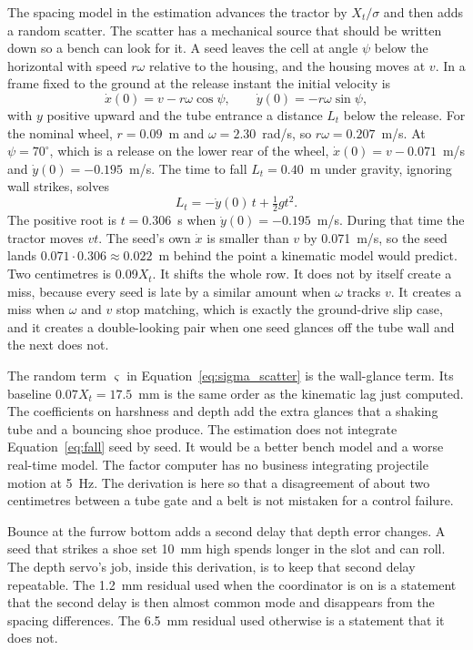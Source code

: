 The spacing model in the estimation advances the tractor by $X_t/\sigma$ and then adds a random scatter. The scatter has a mechanical source that should be written down so a bench can look for it. A seed leaves the cell at angle $\psi$ below the horizontal with speed $r\omega$ relative to the housing, and the housing moves at $v$. In a frame fixed to the ground at the release instant the initial velocity is
\begin{equation}
\dot x(0) = v - r\omega\cos\psi, \qquad \dot y(0) = -r\omega\sin\psi,
\label{eq:v0}
\end{equation}
with $y$ positive upward and the tube entrance a distance $L_t$ below the release. For the nominal wheel, $r=0.09$~m and $\omega=2.30$~rad/s, so $r\omega=0.207$~m/s. At $\psi=70^\circ$, which is a release on the lower rear of the wheel, $\dot x(0)=v-0.071$~m/s and $\dot y(0)=-0.195$~m/s. The time to fall $L_t=0.40$~m under gravity, ignoring wall strikes, solves
\begin{equation}
L_t = -\dot y(0)\,t + \tfrac12 g t^2.
\label{eq:fall}
\end{equation}
The positive root is $t=0.306$~s when $\dot y(0)=-0.195$~m/s. During that time the tractor moves $vt$. The seed's own $\dot x$ is smaller than $v$ by 0.071~m/s, so the seed lands $0.071\cdot 0.306\approx 0.022$~m behind the point a kinematic model would predict. Two centimetres is 0.09$X_t$. It shifts the whole row. It does not by itself create a miss, because every seed is late by a similar amount when $\omega$ tracks $v$. It creates a miss when $\omega$ and $v$ stop matching, which is exactly the ground-drive slip case, and it creates a double-looking pair when one seed glances off the tube wall and the next does not.

The random term $\varsigma$ in Equation~\eqref{eq:sigma_scatter} is the wall-glance term. Its baseline $0.07X_t=17.5$~mm is the same order as the kinematic lag just computed. The coefficients on harshness and depth add the extra glances that a shaking tube and a bouncing shoe produce. The estimation does not integrate Equation~\eqref{eq:fall} seed by seed. It would be a better bench model and a worse real-time model. The factor computer has no business integrating projectile motion at 5~Hz. The derivation is here so that a disagreement of about two centimetres between a tube gate and a belt is not mistaken for a control failure.

Bounce at the furrow bottom adds a second delay that depth error changes. A seed that strikes a shoe set 10~mm high spends longer in the slot and can roll. The depth servo's job, inside this derivation, is to keep that second delay repeatable. The 1.2~mm residual used when the coordinator is on is a statement that the second delay is then almost common mode and disappears from the spacing differences. The 6.5~mm residual used otherwise is a statement that it does not.

